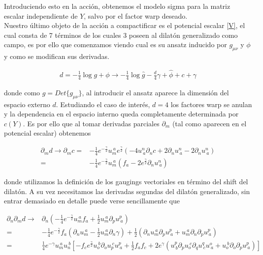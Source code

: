 \documentclass{article}
\numberwithin{equation}{section}
\begin{document}
Introduciendo esto en la acción, obtenemos el modelo sigma para la matriz escalar independiente de $ Y $, salvo por el factor warp deseado.\\


Nuestro último objeto de la acción a compactificar es el potencial escalar \ref{V}, el cual consta de 7 términos de los cuales 3 poseen al dilatón generalizado como campo, es por ello que comenzamos viendo cual es su ansatz inducido por $ g_{\mu \nu} $ y $ \phi $ y como se modifican sus derivadas.

\begin{equation}
\begin{aligned}
d = -\frac{1}{4} \log g + \phi \longrightarrow -\frac{1}{4} \log \hat{g} - \frac{d}{4} \gamma + \hat{\phi}  + c + \gamma
\end{aligned}
\end{equation}

donde como $ g=Det\{ g_{\mu \nu}\} $, al introducir el ansatz aparece la dimensión del espacio externo $ d $. Estudiando el caso de interés, $ d=4 $ los factores warp se anulan y la dependencia en el espacio interno queda completamente determinada por $ c(Y) $. Es por ello que al tomar derivadas parciales $ \partial_m $ (tal como aparecen en el potencial escalar) obtenemos

\begin{equation}
\begin{aligned}
\partial_m d \longrightarrow \partial_m c =& -\frac{1}{4} e^{-\frac{\gamma}{2}} u_{m}^{\ a} e^{\frac{\gamma}{2}} \left( -4  u^{n}_{\ a}\partial_n c + 2\partial_n u^{n}_{\ a}  -2\partial_n u^{n}_{\ a}\right)\\
=& -\frac{1}{4} e^{-\frac{\gamma}{2}} u_{m}^{\ a} \left( f_a  -2 e^{\frac{\gamma}{2}} \partial_n u^{n}_{\ a}\right)
\end{aligned}
\end{equation} 

donde utilizamos la definición de los gaugings vectoriales en término del shift del dilatón. A su vez necesitamos las derivadas segundas del dilatón generalizado, sin entrar demasiado en detalle puede verse sencillamente que

\begin{equation}
\begin{aligned}
\partial_n \partial_m d \longrightarrow& \partial_n \left( -\frac{1}{4} e^{-\frac{\gamma}{2}} u_{m}^{\ a} f_a  + \frac{1}{2} u_{m}^{\ a} \partial_p u^{p}_{\ a} \right)\\
=& -\frac{1}{4} e^{-\frac{\gamma}{2}} f_a \left( \partial_n u_{m}^{\ a} - \frac{1}{2} u_{m}^{\ a} \partial_n \gamma \right) + \frac{1}{2} \left( \partial_n u_{m}^{\ a} \partial_p u^{p}_{\ a} + u_{m}^{\ a} \partial_n \partial_p u^{p}_{\ a} \right)\\
=& \frac{1}{4} e^{-\gamma}u_{m}^{\ a} u_{n}^{\ b} \left[ -f_c e^{\frac{\gamma}{2}} u_{o}^{\ b} \partial_o u_{p}^{\ c} u^{p}_{\ a} + \frac{1}{2} f_a f_c + 2 e^{\gamma} \left( u^{p}_{\ b} \partial_p u_{o}^{\ c} \partial_q u^{q}_{\ c} u^{o}_{\ a} + u_{o}^{\ b} \partial_o \partial_p u^{p}_{\ a} \right)\right]
\end{aligned}
\end{equation}
\end{document}
